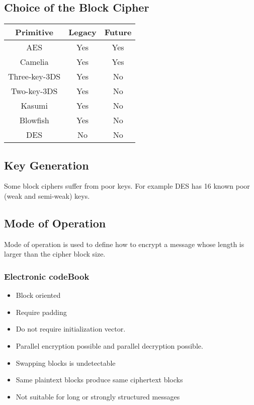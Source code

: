 
\subsection{Choice of the Block Cipher}
\begin{center}
    \begin{tabular}{|c|c|c|}
        \hline
        Primitive & Legacy & Future \\
        \hline
        AES & Yes & Yes \\
        Camelia & Yes & Yes \\
        \hline
        Three-key-3DS & Yes & No \\
        Two-key-3DS & Yes & No \\
        Kasumi & Yes & No \\
        Blowfish & Yes & No \\
        \hline
        DES & No & No\\
        \hline
    \end{tabular}
\end{center}

\subsection{Key Generation}
Some block ciphers suffer from poor keys. For example DES has 16 known poor
(weak and semi-weak) keys. %

\subsection{Mode of Operation} %
Mode of operation is used to define how to encrypt a message whose length
is larger than the cipher block size.
\subsubsection{Electronic codeBook}

\begin{itemize}
    \item Block oriented
    \item Require padding
    \item Do not require initialization vector.
    \item Parallel encryption possible and parallel decryption possible.
    \item Swapping blocks is undetectable
    \item Same plaintext blocks produce same ciphertext blocks
    \item Not suitable for long or strongly structured messages
\end{itemize}

